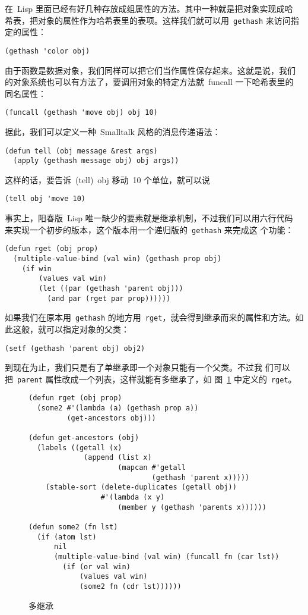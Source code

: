 在~Lisp 里面已经有好几种存放成组属性的方法。其中一种就是把对象实现成哈
希表，把对象的属性作为哈希表里的表项。这样我们就可以用~\texttt{gethash} 来访问指定的属性：
\begin{lstlisting}
(gethash 'color obj)
\end{lstlisting}
由于函数是数据对象，我们同样可以把它们当作属性保存起来。这就是说，我们
的对象系统也可以有方法了，要调用对象的特定方法就~funcall 一下哈希表里的
同名属性：
\begin{lstlisting}
(funcall (gethash 'move obj) obj 10)
\end{lstlisting}
据此，我们可以定义一种~Smalltalk 风格的消息传递语法：
\begin{lstlisting}
(defun tell (obj message &rest args)
  (apply (gethash message obj) obj args))
\end{lstlisting}
这样的话，要告诉~(tell)~obj 移动~10 个单位，就可以说
\begin{lstlisting}
(tell obj 'move 10)
\end{lstlisting}

事实上，阳春版~Lisp 唯一缺少的要素就是继承机制，不过我们可以用六行代码
来实现一个初步的版本，这个版本用一个递归版的~\texttt{gethash} 来完成这
个功能：
\begin{lstlisting}
(defun rget (obj prop)
  (multiple-value-bind (val win) (gethash prop obj)
    (if win
        (values val win)
        (let ((par (gethash 'parent obj)))
          (and par (rget par prop))))))
\end{lstlisting}
如果我们在原本用~\texttt{gethash} 的地方用~\texttt{rget}，就会得到继承而来的属性和方法。如此这般，就可以指定对象的父类：
\begin{lstlisting}
(setf (gethash 'parent obj) obj2)
\end{lstlisting}
到现在为止，我们只是有了单继承\pozhehao{}即一个对象只能有一个父类。不过我
们可以把~\texttt{parent} 属性改成一个列表，这样就能有多继承了，如
图~\ref{fig:multiple_inheritance} 中定义的~\texttt{rget}。

\begin{figure}
\begin{lstlisting}
(defun rget (obj prop)
  (some2 #'(lambda (a) (gethash prop a))
         (get-ancestors obj)))

(defun get-ancestors (obj)
  (labels ((getall (x)
             (append (list x)
                     (mapcan #'getall
                             (gethash 'parent x)))))
    (stable-sort (delete-duplicates (getall obj))
                 #'(lambda (x y)
                     (member y (gethash 'parents x))))))

(defun some2 (fn lst)
  (if (atom lst)
      nil
      (multiple-value-bind (val win) (funcall fn (car lst))
        (if (or val win)
            (values val win)
            (some2 fn (cdr lst))))))
\end{lstlisting}
\caption{\label{fig:multiple_inheritance}多继承}
\end{figure}

